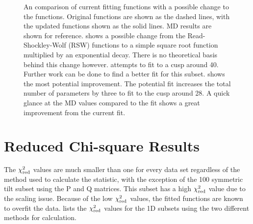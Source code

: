 \documentclass[twoside,senior]{BYUPhys}
\begin{document}
\begin{figure}[ht!]
 
 \caption[Possible changes to fitting functions for the 1D twist subsets.]{\label{fig:updatedGraphs} An comparison of current fitting functions with a possible change to the functions.  Original functions are shown as the dashed lines, with the updated functions shown as the solid lines.  MD results are shown for reference. \protect{} shows a possible change from the Read-Shockley-Wolf (RSW) functions to a simple square root function multiplied by an exponential decay.  There is no theoretical basis behind this change however. \protect{} attempts to fit to a cusp around 40\textdegree{}.  Further work can be done to find a better fit for this subset. \protect{} shows the most potential improvement.  The potential fit increases the total number of parameters by three to fit to the cusp around 28\textdegree.  A quick glance at the MD values compared to the fit shows a great improvement from the current fit.}
 
\end{figure}

\section{Reduced Chi-square Results\label{results:chi2red}}
The $\chi_{\textnormal{red}}^2$ values are much smaller than one for every data set regardless of the method used to calculate the statistic, with the exception of the \textlangle{}100\textrangle{} symmetric tilt subset using the P and Q matrices.  This subset has a high $\chi_{\textnormal{red}}^2$ value due to the scaling issue.  Because of the low $\chi_{\textnormal{red}}^2$ values, the fitted functions are known to overfit the data.\cite{bevington2003}   lists the $\chi_{\textnormal{red}}^2$ values for the 1D subsets using the two different methods for calculation. 
\end{document}
